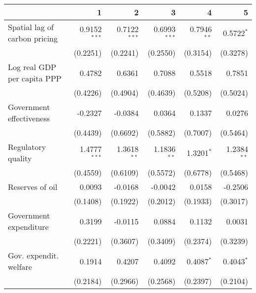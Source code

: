 \begin{tabular}{lrrrrr}
\toprule
{} &                 1 &                 2 &                 3 &                 4 &                 5 \\
\midrule
Spatial lag of carbon pricing    &  0.9152$^{* * *}$ &  0.7122$^{* * *}$ &  0.6993$^{* * *}$ &    0.7946$^{* *}$ &      0.5722$^{*}$ \\
                                 &          (0.2251) &          (0.2241) &          (0.2550) &          (0.3154) &          (0.3278) \\
Log real GDP per capita PPP      &            0.4782 &            0.6361 &            0.7088 &            0.5518 &            0.7851 \\
                                 &          (0.4226) &          (0.4904) &          (0.4639) &          (0.5208) &          (0.5024) \\
Government effectiveness         &           -0.2327 &           -0.0384 &            0.0364 &            0.1337 &            0.0276 \\
                                 &          (0.4439) &          (0.6692) &          (0.5882) &          (0.7007) &          (0.5464) \\
Regulatory quality               &  1.4777$^{* * *}$ &    1.3618$^{* *}$ &    1.1836$^{* *}$ &      1.3201$^{*}$ &    1.2384$^{* *}$ \\
                                 &          (0.4559) &          (0.6109) &          (0.5572) &          (0.6778) &          (0.5468) \\
Reserves of oil                  &            0.0093 &           -0.0168 &           -0.0042 &            0.0158 &           -0.2506 \\
                                 &          (0.1408) &          (0.1922) &          (0.2012) &          (0.1933) &          (0.3017) \\
Government expenditure           &            0.3199 &           -0.0115 &            0.0884 &            0.1132 &            0.0031 \\
                                 &          (0.2221) &          (0.3607) &          (0.3409) &          (0.2374) &          (0.3239) \\
Gov. expendit. welfare           &            0.1914 &            0.4207 &            0.4092 &      0.4087$^{*}$ &      0.4043$^{*}$ \\
                                 &          (0.2184) &          (0.2966) &          (0.2568) &          (0.2397) &          (0.2104) \\

\end{tabular}
